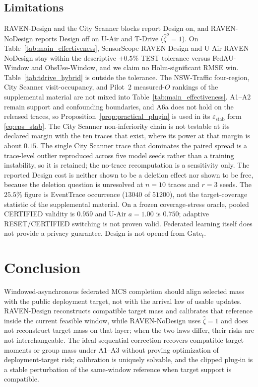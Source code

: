 \documentclass[letterpaper,journal]{IEEEtran}
\begin{document}
\subsection{Limitations}
\label{subsec:limitations}

RAVEN-Design and the City Scanner blocks report Design on, and RAVEN-NoDesign
reports Design off on U-Air and T-Drive ($\widehat\zeta^{o}=1$).  On
Table~\ref{tab:main_effectiveness}, SensorScope RAVEN-Design and U-Air
RAVEN-NoDesign stay within the descriptive $+0.5\%$ TEST tolerance versus
FedAU-Window and ObsUse-Window, and we claim no Holm-significant RMSE win.
Table~\ref{tab:tdrive_hybrid} is outside the tolerance.  The
NSW-Traffic four-region, City Scanner visit-occupancy, and Pilot~2 measured-$O$
rankings of the supplemental material are not mixed into
Table~\ref{tab:main_effectiveness}.  A1--A2 remain support and confounding
boundaries, and A6a does not hold on the released traces, so
Proposition~\ref{prop:practical_plugin} is used in its
$\varepsilon_{\mathrm{stab}}$ form \eqref{eq:eps_stab}.  The City Scanner
non-inferiority chain is not testable at its declared margin with the ten traces
that exist, where its power at that margin is about $0.15$.  The single City
Scanner trace that dominates the paired spread is a trace-level outlier
reproduced across five model seeds rather than a training instability, so it is
retained; the no-trace recomputation is a sensitivity only.  The reported
Design cost is neither shown to be a deletion effect nor shown to be free, because
the deletion question is unresolved at $n=10$ traces and $r=3$ seeds.
The $25.5\%$ figure is
EventTrace occurrence ($13040$ of $51200$), not the target-coverage statistic of
the supplemental material.  On a frozen coverage-stress oracle, pooled CERTIFIED
validity is $0.959$ and U-Air $a=1.00$ is $0.750$; adaptive RESET/CERTIFIED
switching is not proven valid.  Federated learning itself does not provide a
privacy guarantee.  Design is not opened from $\mathrm{Gate}_t$.


\section{Conclusion}
\label{sec:conclusion}

Windowed-asynchronous federated MCS completion should align selected mass
with the public deployment target, not with the arrival law of usable
updates.  RAVEN-Design reconstructs compatible target mass and calibrates that
reference inside the current feasible window, while RAVEN-NoDesign uses
$\widehat\zeta=1$ and does not reconstruct target mass on that layer; when the
two laws differ, their risks are not interchangeable.  The ideal sequential
correction recovers compatible target moments or group mass under A1--A3 without
proving optimization of deployment-target risk; calibration is uniquely solvable,
and the clipped plug-in is a stable perturbation of the same-window reference
when target support is compatible.
\end{document}
